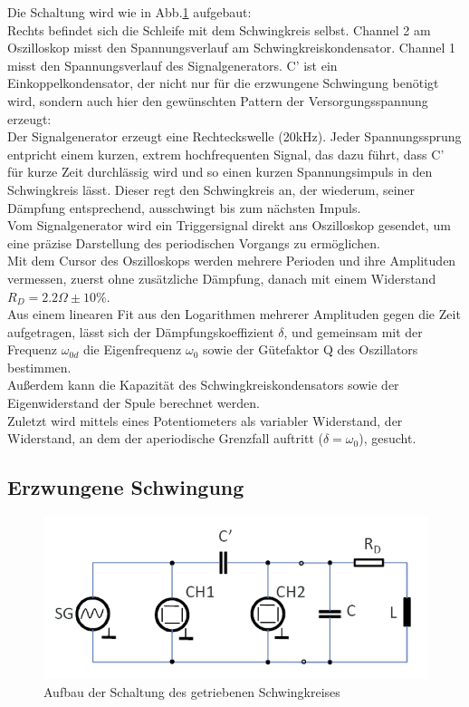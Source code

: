 \documentclass[12pt,a4paper]{article}
\begin{document}
\begin{multicols}{2}
Die Schaltung wird wie in Abb.\ref{fig:schwingkreis_aufbau} aufgebaut:\\
Rechts befindet sich die Schleife mit dem Schwingkreis selbst. Channel 2 am Oszilloskop misst den Spannungsverlauf am Schwingkreiskondensator. Channel 1 misst den Spannungsverlauf des Signalgenerators. C' ist ein Einkoppelkondensator, der nicht nur für die erzwungene Schwingung benötigt wird, sondern auch hier den gewünschten Pattern der Versorgungsspannung erzeugt:\\
Der Signalgenerator erzeugt eine Rechteckswelle (20kHz). Jeder Spannungssprung entpricht einem kurzen, extrem hochfrequenten Signal, das dazu führt, dass C' für kurze Zeit durchlässig wird und so einen kurzen Spannungsimpuls in den Schwingkreis lässt. Dieser regt den Schwingkreis an, der wiederum, seiner Dämpfung entsprechend, ausschwingt bis zum nächsten Impuls.\\
Vom Signalgenerator wird ein Triggersignal direkt ans Oszilloskop gesendet, um eine präzise Darstellung des periodischen Vorgangs zu ermöglichen.\\

\noindent Mit dem Cursor des Oszilloskops werden mehrere Perioden und ihre Amplituden vermessen, zuerst ohne zusätzliche Dämpfung, danach mit einem Widerstand $R_D=2.2\Omega \pm 10\%$.\\
Aus einem linearen Fit aus den Logarithmen mehrerer Amplituden gegen die Zeit aufgetragen, lässt sich der Dämpfungskoeffizient $\delta$, und gemeinsam mit der Frequenz $\omega_{0d}$ die Eigenfrequenz $\omega_0$ sowie der Gütefaktor Q des Oszillators bestimmen.\\
Außerdem kann die Kapazität des Schwingkreiskondensators sowie der Eigenwiderstand der Spule berechnet werden.\\

\noindent Zuletzt wird mittels eines Potentiometers als variabler Widerstand, der Widerstand, an dem der aperiodische Grenzfall auftritt ($\delta = \omega_0$), gesucht.


\subsection{Erzwungene Schwingung}

\begin{figure}[H]
	\centering
	\includegraphics[scale=0.6]{./figure/schwingkreis_aufbau.png}
	\caption{Aufbau der Schaltung des getriebenen Schwingkreises}
	\label{fig:schwingkreis_aufbau}
\end{figure}


\end{multicols}
\end{document}
